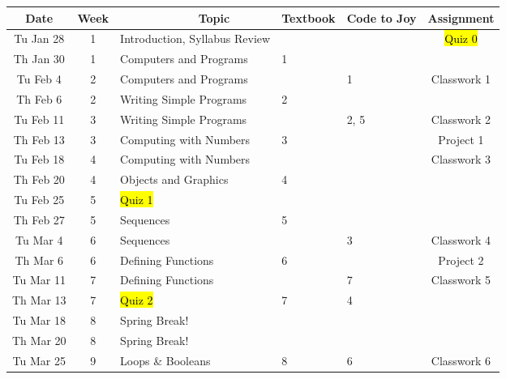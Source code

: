 \documentclass[letter,10pt]{article}
\begin{document}
\begin{comment}
M Nov 25  & 14 & Object Oriented Design & & & Classwork 9 \\
W Nov 27  & 14 & Algorithm Design \& Recursion & & & \\ \hline
M Dec 2   & 15 & Algorithm Design \& Recursion & 13 & & \\
W Dec 4   & 15 & \hl{Quiz 4} \textit{Updated 11/20} & & 9 & Classwork 10 \\
M Dec 9   & 16 & Review & & & \\
W Dec 11  & 16 & \hl{Study Day, no class} & & & \\
M Dec 16  & 17 & \hl{Final Exam, 6-8PM.} & & & \\
\end{tabular}
\end{comment}

\small
\begin{tabular}{c c l l l c}
Date           & Week & ~~~~~~~~~~~~Topic & Textbook & Code to Joy & Assignment \\ \hline
Tu Jan 28  & 1  & Introduction, Syllabus Review & & & \hl{Quiz 0} \\
Th Jan 30  & 1  & Computers and Programs & 1 & & \\ \hline
Tu Feb 4    & 2  & Computers and Programs & & 1 & Classwork 1 \\
Th Feb 6    & 2  & Writing Simple Programs & 2 & & \\
Tu Feb 11  & 3  & Writing Simple Programs & & 2, 5 & Classwork 2 \\
Th Feb 13  & 3  & Computing with Numbers & 3 & & Project 1\\
Tu Feb 18  & 4  & Computing with Numbers & & & Classwork 3 \\
Th Feb 20  & 4  & Objects and Graphics & 4 & & \\
Tu Feb 25  & 5  & \hl{Quiz 1} & & & \\
Th Feb 27  & 5  & Sequences & 5 & & \\ \hline
Tu Mar 4    & 6  & Sequences & & 3 & Classwork 4 \\
Th Mar 6    & 6  & Defining Functions & 6 & & Project 2\\
Tu Mar 11  & 7  & Defining Functions & & 7 & Classwork 5 \\
Th Mar 13  & 7  & \hl{Quiz 2} & 7 & 4 & \\
Tu Mar 18  & 8  & {\color{cadmiumgreen}Spring Break!} & & & \\
Th Mar 20  & 8  & {\color{cadmiumgreen}Spring Break!} & & & \\
Tu Mar 25  & 9  & Loops \& Booleans & 8 & 6 & Classwork 6 \\

\end{tabular}
\end{document}
